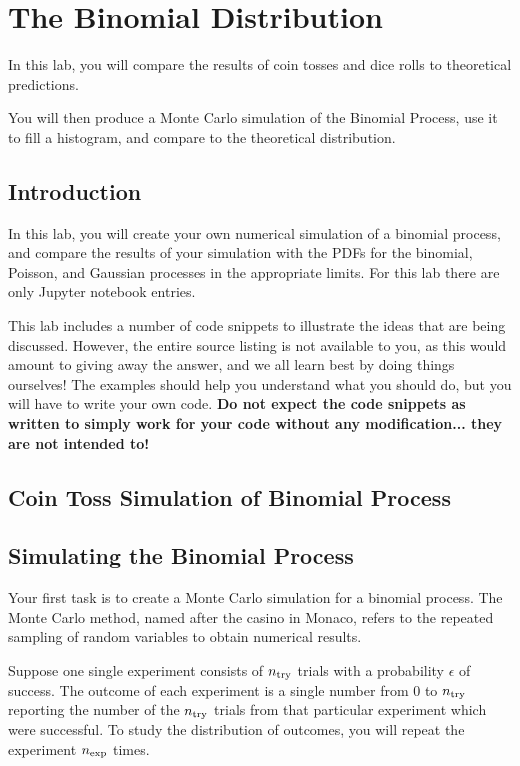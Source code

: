 \chapter{The Binomial Distribution}

In this lab, you will compare the results of coin tosses and dice rolls to theoretical predictions.

You will then produce a Monte Carlo simulation of the Binomial Process, use it to fill a histogram, and compare to the theoretical distribution.



\section{Introduction}

In this lab, you will create your own numerical simulation of a binomial
process, and compare the results of your simulation with the PDFs for
the binomial, Poisson, and Gaussian processes in the appropriate
limits.  For this lab there are only Jupyter notebook entries. 


This lab includes a number of code snippets to illustrate the ideas
that are being discussed.  However, the entire source listing is not
available to you, as this would amount to giving away the answer, and
we all learn best by doing things ourselves!  The examples should
help you understand what you should do, but you will have to write
your own code.  {\bf Do not expect the code snippets as written to
  simply work for your code without any modification... they are not
  intended to!}

\section{Coin Toss Simulation of Binomial Process}

\section{Simulating the Binomial Process}

Your first task is to create a Monte Carlo simulation for a binomial
process.  The Monte Carlo method, named after the casino in Monaco, refers
to the repeated sampling of random variables to obtain numerical results.

Suppose one single experiment consists of $n_{\rm try}$ trials with a
probability $\epsilon$ of success.  The outcome of each experiment is
a single number from 0 to $n_{\rm try}$ reporting the number of the
$n_{\rm try}$ trials from that particular experiment which were
successful.  To study the distribution of outcomes, you will repeat the
experiment $n_{\rm exp}$ times.


